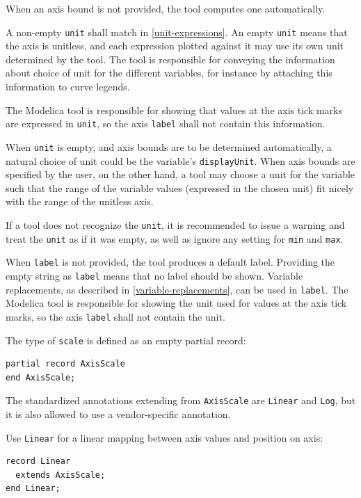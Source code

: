 When an axis bound is not provided, the tool computes one automatically.

A non-empty \lstinline!unit! shall match  in \cref{unit-expressions}.
An empty \lstinline!unit! means that the axis is unitless, and each expression plotted against it may use its own unit determined by the tool.
The tool is responsible for conveying the information about choice of unit for the different variables, for instance by attaching this information to curve legends.

The Modelica tool is responsible for showing that values at the axis tick marks are expressed in \lstinline!unit!, so the axis \lstinline!label! shall not contain this information.

\begin{nonnormative}
When \lstinline!unit! is empty, and axis bounds are to be determined automatically, a natural choice of unit could be the variable's \lstinline!displayUnit!.
When axis bounds are specified by the user, on the other hand, a tool may choose a unit for the variable such that the range of the variable values (expressed in the chosen unit) fit nicely with the range of the unitless axis.
\end{nonnormative}

If a tool does not recognize the \lstinline!unit!, it is recommended to issue a warning and treat the \lstinline!unit! as if it was empty, as well as ignore any setting for \lstinline!min! and \lstinline!max!.

When \lstinline!label! is not provided, the tool produces a default label.
Providing the empty string as \lstinline!label! means that no label should be shown.
Variable replacements, as described in \cref{variable-replacements}, can be used in \lstinline!label!.
The Modelica tool is responsible for showing the unit used for values at the axis tick marks, so the axis \lstinline!label! shall not contain the unit.

The type of \lstinline!scale! is defined as an empty partial record:
\begin{lstlisting}[language=modelica]
partial record AxisScale
end AxisScale;
\end{lstlisting}%

The standardized annotations extending from \lstinline!AxisScale! are \lstinline!Linear! and \lstinline!Log!, but it is also allowed to use a vendor-specific annotation.

Use \lstinline!Linear! for a linear mapping between axis values and position on axis:
\begin{lstlisting}[language=modelica]
record Linear
  extends AxisScale;
end Linear;
\end{lstlisting}%

